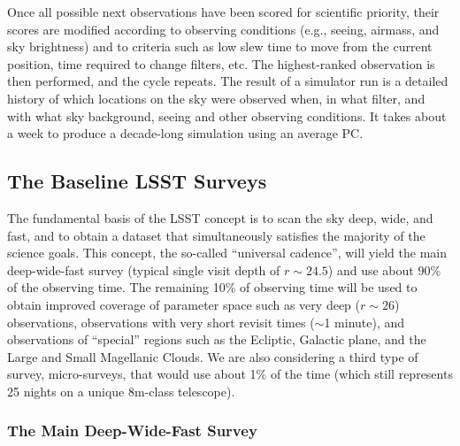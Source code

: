 \documentclass{emulateapj}
\begin{document}
Once all possible next observations have been scored for scientific priority, their
scores are modified according to observing conditions (e.g., seeing, airmass, 
and sky brightness) and to criteria such as low slew time to move from the current 
position, time required to change filters, etc. The highest-ranked observation is 
then performed, and the cycle repeats. The result of a simulator run is a
detailed history of which locations on the sky were observed when, in what
filter, and with what sky background, seeing and other observing conditions. 
It takes about a week to produce a decade-long simulation using an average 
PC. 

\subsection{ The Baseline LSST Surveys }

The fundamental basis of the LSST concept is to scan the sky deep, wide, and
fast, and to obtain a dataset that simultaneously satisfies the majority
of the science goals. This concept, the so-called ``universal cadence'', will
yield the main deep-wide-fast survey (typical single visit depth of $r\sim24.5$)
and use about 90\% of the observing time. The remaining 10\% of observing 
time will be used to obtain improved coverage of parameter space such as 
very deep ($r\sim26$) observations, observations with very short revisit 
times ($\sim$1 minute), and observations of ``special'' regions such as the 
Ecliptic, Galactic plane, and the Large and Small Magellanic Clouds. 
We are also considering a third type of survey, micro-surveys, that would 
use about 1\% of the time (which still represents 25 nights on a unique 
8m-class telescope). 

\subsubsection{ The Main Deep-Wide-Fast Survey }
\end{document}
